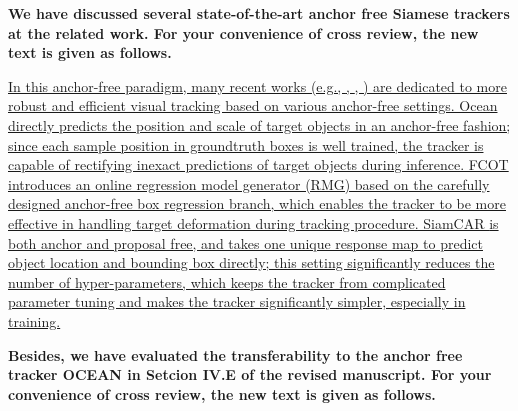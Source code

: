 \documentclass[12pt]{article}
\begin{document}
\textbf{We have discussed several state-of-the-art anchor free Siamese trackers at the related work. For your convenience of cross review, the new text is given as follows.}

\uline{In this anchor-free paradigm, many recent works (e.g., \cite{zhang2020ocean}, \cite{cui2020fully}, \cite{9157720}) are dedicated to more robust and efficient visual tracking based on various anchor-free settings.
Ocean \cite{zhang2020ocean} directly predicts the position and scale of target objects in an anchor-free fashion; since each sample position in groundtruth boxes is well trained, the tracker is capable of rectifying inexact predictions of target objects during inference.
FCOT \cite{cui2020fully} introduces an online regression model generator (RMG) based on the carefully designed anchor-free box regression branch, which enables the tracker to be more effective in handling target deformation during tracking procedure.
SiamCAR \cite{9157720} is both anchor and proposal free, and takes one unique response map to predict object location and bounding box directly; this setting significantly reduces the number of hyper-parameters, which keeps the tracker from complicated parameter tuning and makes the tracker significantly simpler, especially in training.
}

\textbf{Besides, we have evaluated the transferability to the anchor free tracker OCEAN in Setcion IV.E of the revised manuscript. For your convenience of cross review, the new text is given as follows.}
\end{document}
